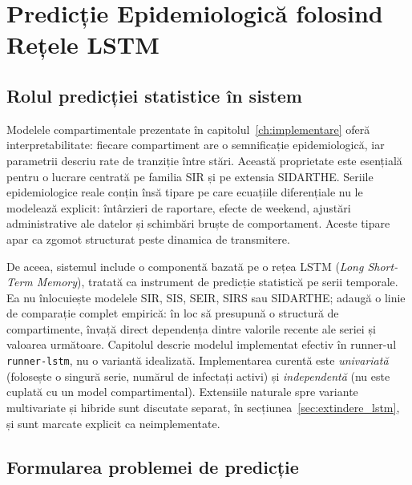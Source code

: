 
\chapter{Predicție Epidemiologică folosind Rețele LSTM}
\label{ch:lstm}

\section{Rolul predicției statistice în sistem}
\label{sec:rol_lstm}

Modelele compartimentale prezentate în capitolul~\ref{ch:implementare} oferă
interpretabilitate: fiecare compartiment are o semnificație epidemiologică, iar
parametrii descriu rate de tranziție între stări. Această proprietate este
esențială pentru o lucrare centrată pe familia SIR și pe extensia SIDARTHE.
Seriile epidemiologice reale conțin însă tipare pe care ecuațiile diferențiale
nu le modelează explicit: întârzieri de raportare, efecte de weekend, ajustări
administrative ale datelor și schimbări bruște de comportament. Aceste tipare
apar ca zgomot structurat peste dinamica de transmitere.

De aceea, sistemul include o componentă bazată pe o rețea LSTM
(\emph{Long Short-Term Memory}), tratată ca instrument de predicție statistică
pe serii temporale. Ea nu înlocuiește modelele SIR, SIS, SEIR, SIRS sau
SIDARTHE; adaugă o linie de comparație complet empirică: în loc să presupună
o structură de compartimente, învață direct dependența dintre valorile recente
ale seriei și valoarea următoare. Capitolul descrie modelul implementat efectiv
în runner-ul \texttt{runner-lstm}, nu o variantă idealizată. Implementarea
curentă este \emph{univariată} (folosește o singură serie, numărul de
infectați activi) și \emph{independentă} (nu este cuplată cu un model
compartimental). Extensiile naturale spre variante multivariate și hibride sunt
discutate separat, în secțiunea~\ref{sec:extindere_lstm}, și sunt marcate
explicit ca neimplementate.

\section{Formularea problemei de predicție}
\label{sec:formulare_lstm}

